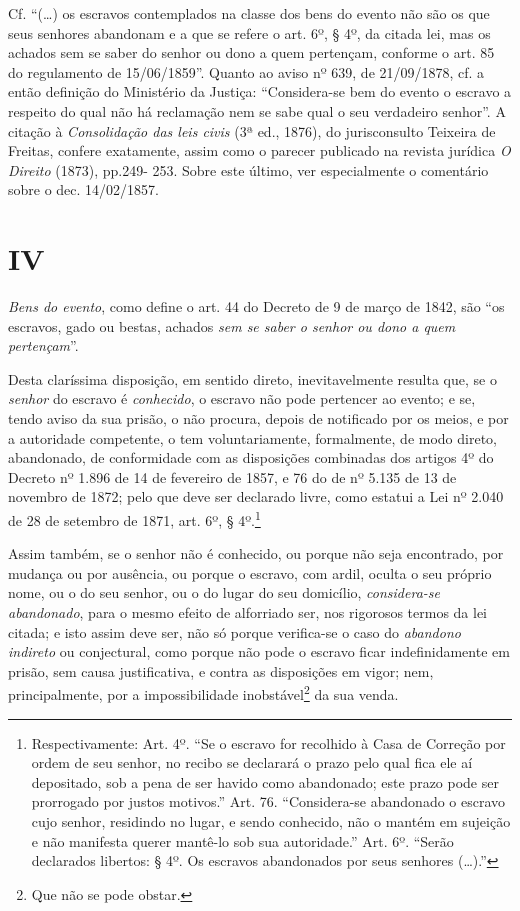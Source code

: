 {{  Cf. ``(\ldots{}) os escravos contemplados na classe dos bens do evento não
  são os que seus senhores abandonam e a que se refere o art. 6º, § 4º,
  da citada lei, mas os achados sem se saber do senhor ou dono a quem
  pertençam, conforme o art. 85 do regulamento de 15/06/1859''. Quanto ao
  aviso nº 639, de 21/09/1878, cf. a então definição do Ministério da
  Justiça: ``Considera-se bem do evento o escravo a respeito do qual não
  há reclamação nem se sabe qual o seu verdadeiro senhor''. A citação à
  \emph{Consolidação das leis civis} (3ª ed., 1876), do jurisconsulto
  Teixeira de Freitas, confere exatamente, assim como o parecer
  publicado na revista jurídica \emph{O Direito} (1873), pp.249- 253.
  Sobre este último, ver especialmente o comentário sobre o dec.
  14/02/1857.}

\section*{IV}

\emph{Bens do evento}, como define o art. 44 do Decreto de 9 de março de
1842, são ``os escravos, gado ou bestas, achados \emph{sem se saber o
senhor ou dono a quem pertençam}''.

Desta claríssima disposição, em sentido direto, inevitavelmente resulta
que, se o \emph{senhor} do escravo é \emph{conhecido}, o escravo não
pode pertencer ao evento; e se, tendo aviso da sua prisão, o não
procura, depois de notificado por os meios, e por a autoridade
competente, o tem voluntariamente, formalmente, de modo direto,
abandonado, de conformidade com as disposições combinadas dos artigos 4º
do Decreto nº 1.896 de 14 de fevereiro de 1857, e 76 do de nº 5.135 de
13 de novembro de 1872; pelo que deve ser declarado livre, como estatui
a Lei nº 2.040 de 28 de setembro de 1871, art. 6º, § 4º.\footnote{
  Respectivamente: Art. 4º. ``Se o escravo for recolhido à Casa de
  Correção por ordem de seu senhor, no recibo se declarará o prazo pelo
  qual fica ele aí depositado, sob a pena de ser havido como abandonado;
  este prazo pode ser prorrogado por justos motivos.'' Art. 76.
  ``Considera-se abandonado o escravo cujo senhor, residindo no lugar, e
  sendo conhecido, não o mantém em sujeição e não manifesta querer
  mantê-lo sob sua autoridade.'' Art. 6º. ``Serão declarados libertos: § 4º.
  Os escravos abandonados por seus senhores (\ldots{}).''}

Assim também, se o senhor não é conhecido, ou porque não seja
encontrado, por mudança ou por ausência, ou porque o escravo, com ardil,
oculta o seu próprio nome, ou o do seu senhor, ou o do lugar do seu
domicílio, \emph{considera-se abandonado}, para o mesmo efeito de
alforriado ser, nos rigorosos termos da lei citada; e isto assim deve
ser, não só porque verifica-se o caso do \emph{abandono indireto} ou
conjectural, como porque não pode o escravo ficar indefinidamente em
prisão, sem causa justificativa, e contra as disposições em vigor; nem,
principalmente, por a impossibilidade inobstável\footnote{Que não se
  pode obstar.} da sua venda.

}
